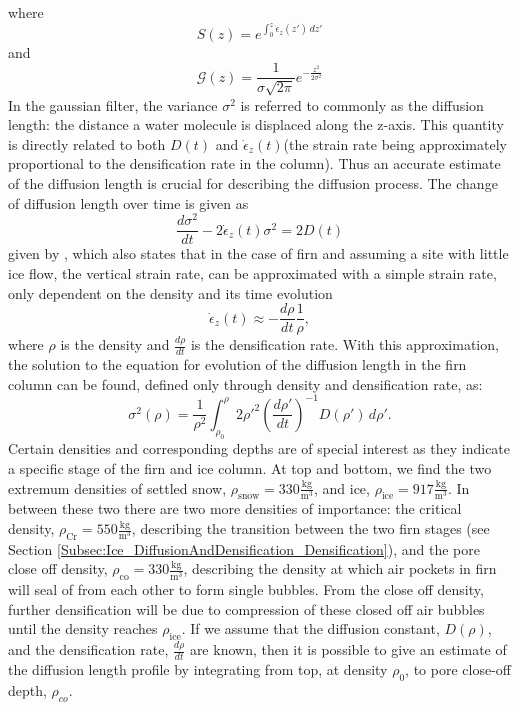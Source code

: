\documentclass[../../CompleteThesis2/Complete_2ndDraft]{subfiles}
\begin{document}
where
\begin{equation}
	S(z) = e^{\int_{0}^{z}\dot{\epsilon}_z(z')\, dz'}
	\label{Eq:Thinning_fct}
\end{equation}
and
\begin{equation}
	\mathcal{G}(z) = \frac{1}{\sigma\sqrt{2\pi}}e^{-\frac{z^2}{2\sigma^2}}
	\label{Eq:Gauss_filter}
\end{equation}
In the gaussian filter, the variance $\sigma^2$ is referred to commonly as the diffusion length: the distance a water molecule is displaced along the z-axis. This quantity is directly related to both $D(t)$ and $\dot{\epsilon}_z(t)$(the strain rate being approximately proportional to the densification rate in the column). Thus an accurate estimate of the diffusion length is crucial for describing the diffusion process.
The change of diffusion length over time is given as 
\begin{equation}
	\frac{d\sigma^2}{dt} - 2\dot{\epsilon}_z (t)\sigma^2 = 2 D(t)
	\label{Eq:Evolution_DiffLen}
\end{equation}
given by \cite[Johnsen, 1977]{Johnsen1977}, which also states that in the case of firn and assuming a site with little ice flow, the vertical strain rate, can be approximated with a simple strain rate, only dependent on the density and its time evolution
\begin{equation}
	\dot{\epsilon}_z(t) \approx - \frac{d\rho}{dt}\frac{1}{\rho}
	\label{Eq:strain_rate_approx},
\end{equation}
where $\rho$ is the density and $\frac{d\rho}{dt}$ is the densification rate. With this approximation, the solution to the equation for evolution of the diffusion length in the firn column can be found, defined only through density and densification rate, as:
\begin{equation}
	\sigma^2(\rho) =\frac{1}{\rho^2} \int_{\rho_0}^{\rho}2\rho'^2\left(\frac{d\rho'}{dt}\right)^{-1} D(\rho') \, d\rho'.
	\label{Eq:Diff_Len_Firn}
\end{equation}
Certain densities and corresponding depths are of special interest as they indicate a specific stage of the firn and ice column. At top and bottom, we find the two extremum densities of settled snow, $\rho_{\text{snow}} = 330 \frac{\text{kg}}{\text{m}^3}$, and ice, $\rho_{\text{ice}} = 917 \frac{\text{kg}}{\text{m}^3}$. In between these two there are two more densities of importance: the critical density, $\rho_{\text{Cr}} = 550 \frac{\text{kg}}{\text{m}^3}$, describing the transition between the two firn stages (see Section \ref{Subsec:Ice_DiffusionAndDensification_Densification}), and the pore close off density, $\rho_{\text{co}} = 330 \frac{\text{kg}}{\text{m}^3}$, describing the density at which air pockets in firn will seal of from each other to form single bubbles. From the close off density, further densification will be due to compression of these closed off air bubbles until the density reaches $\rho_{\text{ice}}$.
If we assume that the diffusion constant, $D(\rho)$, and the densification rate, $\frac{d\rho}{dt}$ are known, then it is possible to give an estimate of the diffusion length profile by integrating from top, at density $\rho_0$, to pore close-off depth, $\rho_{co}$.
\end{document}

